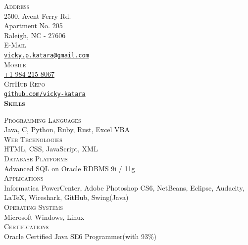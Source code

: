 \documentclass[letterpaper,12pt,final]{memoir}
\newcommand{\Sep}{\vspace{1.5em}}
\newcommand{\SmallSep}{\vspace{0.5em}}
\newcommand{\CVSection}[1]
	{\Large\textbf{\textsc{{#1}}}\par
	\SmallSep\normalsize\normalfont}
\newcommand{\CVItemSC}[1]
{{\textsc{\color{Plum} #1}}}
\begin{document}

\begin{flushright} 
	\footnotesize
	\SmallSep
	\CVItemSC{Address}\\%
	
	2500, Avent Ferry Rd.\\
	Apartment No. 205\\
	Raleigh, NC - 27606\\
	\Sep
	\CVItemSC{E-Mail}\\%
	\href{mailto:vicky.p.katara@gmail.com}{\texttt{vicky.p.katara@gmail.com}}\\
	\Sep
	\CVItemSC{Mobile}\\%
	\href{tel:+19842158067}{+1 984 215 8067}\\
	\SmallSep
	\Sep
	\CVItemSC{GitHub Repo}\\%
	\href{https://github.com/vicky-katara}{\texttt{github.com/vicky-katara}}\\
	\SmallSep
\SmallSep
\CVSection{Skills}
\CVItemSC{Programming Languages}\\
{\footnotesize Java, C, Python, Ruby, Rust, Excel VBA}
\SmallSep\\
\CVItemSC{Web Technologies}\\
{\footnotesize HTML, CSS, JavaScript, XML}
\SmallSep\\
\CVItemSC{Database Platforms}\\
{\footnotesize Advanced SQL on Oracle RDBMS 9i / 11g}
\SmallSep\\
\CVItemSC{Applications}\\
{\footnotesize Informatica PowerCenter, Adobe Photoshop CS6, NetBeans, Eclipse, Audacity, \LaTeX, Wireshark, GitHub, Swing(Java)}
\SmallSep\\
\CVItemSC{Operating Systems}\\
{\footnotesize Microsoft Windows, Linux}
\SmallSep\\
\CVItemSC{Certifications}\\
{\footnotesize Oracle Certified Java SE6 Programmer\space(with 93\%)}
\end{flushright}\normalsize
\end{document}
